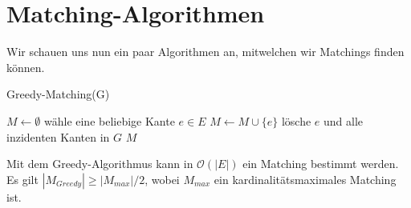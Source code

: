 \section{Matching-Algorithmen}

Wir schauen uns nun ein paar Algorithmen an, mitwelchen wir Matchings finden können.

\begin{algorithm}
    \caption{Greedy-Matching(G)}
    \begin{algorithmic}[1]
        \State $M \leftarrow \emptyset$
            \State wähle eine beliebige Kante $e \in E$
            \State $ M \leftarrow M \cup \{e\}$
            \State lösche $e$ und alle inzidenten Kanten in $G$
        \EndWhile
        \State \Return $M$
    \end{algorithmic}
\end{algorithm}

Mit dem Greedy-Algorithmus kann in $\mathcal{O}(|E|)$ ein Matching bestimmt werden. Es gilt
$|M_{Greedy}| \geq |M_{max}| / 2$, wobei $M_{max}$ ein kardinalitätsmaximales Matching ist.